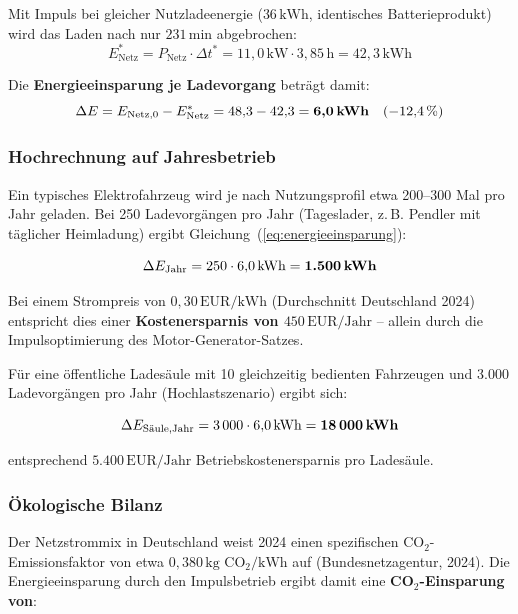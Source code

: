 ﻿\documentclass[a4paper,12pt]{article}
\begin{document}
Mit Impuls bei gleicher Nutzladeenergie ($36\,\text{kWh}$, identisches
Batterieprodukt) wird das Laden nach nur $231\,\text{min}$ abgebrochen:
\begin{equation}
  E_\text{Netz}^* = P_\text{Netz} \cdot \Delta t^*
  = 11{,}0\,\text{kW} \cdot 3{,}85\,\text{h} = 42{,}3\,\text{kWh}
\end{equation}

Die \textbf{Energieeinsparung je Ladevorgang} beträgt damit:
\begin{equation}
  \Delta E = E_\text{Netz,0} - E_\text{Netz}^*
  = 48{,}3 - 42{,}3 = \textbf{6{,}0\,\text{kWh}}
  \quad (-12{,}4\,\%)
  \label{eq:energieeinsparung}
\end{equation}

\subsubsection{Hochrechnung auf Jahresbetrieb}

Ein typisches Elektrofahrzeug wird je nach Nutzungsprofil etwa
200--300 Mal pro Jahr geladen. Bei 250 Ladevorgängen pro Jahr
(Tageslader, z.\,B. Pendler mit täglicher Heimladung) ergibt
Gleichung~(\ref{eq:energieeinsparung}):

\begin{equation}
  \Delta E_\text{Jahr} = 250 \cdot 6{,}0\,\text{kWh} = \textbf{1.500\,\text{kWh}}
\end{equation}

Bei einem Strompreis von $0{,}30\,\text{EUR/kWh}$ (Durchschnitt Deutschland
2024) entspricht dies einer \textbf{Kostenersparnis von
$450\,\text{EUR/Jahr}$} -- allein durch die Impulsoptimierung des
Motor-Generator-Satzes.

Für eine öffentliche Ladesäule mit 10 gleichzeitig bedienten Fahrzeugen
und 3.000 Ladevorgängen pro Jahr (Hochlastszenario) ergibt sich:

\begin{equation}
  \Delta E_\text{Säule,Jahr} = 3\,000 \cdot 6{,}0\,\text{kWh}
  = \textbf{18\,000\,\text{kWh}}
\end{equation}

entsprechend $5.400\,\text{EUR/Jahr}$ Betriebskostenersparnis pro Ladesäule.

\subsubsection{Ökologische Bilanz}

Der Netzstrommix in Deutschland weist 2024 einen spezifischen
CO${}_2$-Emissionsfaktor von etwa $0{,}380\,\text{kg CO${}_2$/kWh}$ auf
(Bundesnetzagentur, 2024). Die Energieeinsparung durch den Impulsbetrieb
ergibt damit eine \textbf{CO${}_2$-Einsparung von}:
\end{document}
